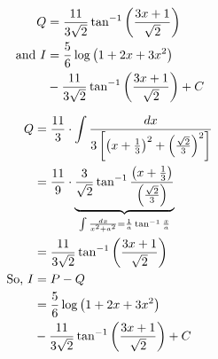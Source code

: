\documentclass[14pt,fleqn]{extarticle}
\begin{document}
\newcard 
\begin{align}
	Q &= \intgb \\
	\text{and } I &= \intga \\
	&- \intgb + C  
\end{align}

\newcard 

\begin{align}
Q &= \frac{11}{3}\cdot \int \frac{dx}{3 \left[\trma^2 + \trmk^2 \right]} \\
&= \frac{11}{9}\cdot \underbrace{\frac{3}{\sqrt{2}}\tan^{-1} \frac{\trma}{\trmk}}_{\int \frac{dx}{x^2 + a^2} = \frac{1}{a}\tan^{-1} \frac{x}{a}} \\
&= \intgb \\
\text{So, } I &= P - Q \\ 
&= \intga  \\
&- \intgb + C 
\end{align}
\end{document}
